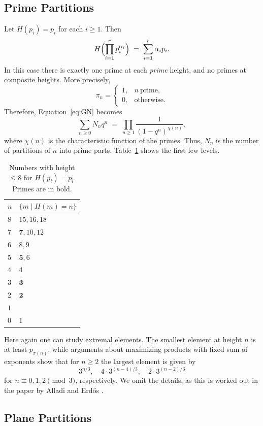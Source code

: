 \documentclass[11pt]{article}
\theoremstyle{definition}
\begin{document}
\subsection{Prime Partitions}
\label{ex:H=prime}

Let $H(p_i)=p_i$ for each $i\ge1$.  Then
\[
  H\Bigl(\prod_{i=1}^r p_i^{\alpha_i}\Bigr)
  \;=\; \sum_{i=1}^r \alpha_i p_i.
\]
In this case there is exactly one prime at each \emph{prime} height,
and no primes at composite heights.  More precisely,
\[
  \pi_n = \begin{cases} 1, & n\ \text{prime},\\[3pt]
                        0, & \text{otherwise}.
          \end{cases}
\]
Therefore, Equation~\eqref{eq:GN} becomes
\[
  \sum_{n\ge0} N_n q^n
  \;=\;
  \prod_{n\ge1} \frac{1}{(1-q^n)^{\chi(n)}},
\]
where $\chi(n)$ is the characteristic function of the primes.  Thus,
$N_n$ is the number of partitions of $n$ into prime parts.  Table~\ref{tab:H=prime} shows the first few levels.

\begin{table}[ht]
\centering
\begin{tabular}{| l | l | }
\hline\hline
$n$ & $\{m\mid H(m)=n\}$\\
\hline
$8$ & $15, 16, 18$ \\
$7$ & $\mathbf{7}, 10, 12$ \\
$6$ & $8, 9$ \\
$5$ & $\mathbf{5}, 6$ \\
$4$ & $4$ \\
$3$ & $\mathbf{3}$ \\
$2$ & $\mathbf{2}$ \\
$1$ & \\
$0$ & $1$ \\
\hline
\end{tabular}
\caption{Numbers with height $\le 8$ for $H(p_i)=p_i$. Primes are in bold.}
\label{tab:H=prime}
\end{table} 

Here again one can study extremal elements.  The smallest element at
height $n$ is at least $p_{\pi(n)}$, while arguments about
maximizing products with fixed sum of exponents show that for $n\ge2$
the largest element is given by
\[
  3^{n/3},\quad 4\cdot 3^{(n-4)/3},\quad
  2\cdot 3^{(n-2)/3}
\]
for $n\equiv0,1,2\pmod{3}$, respectively.  We omit the
details, as this is worked out in the paper by Alladi and Erd\H{o}s \cite{alladi}. 


\subsection{Plane Partitions}
\label{ex:plane}
\end{document}
